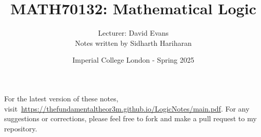 \documentclass[a4paper, 12pt, openany, oneside]{book}
\title{\vspace{-2em}MATH70132: Mathematical Logic}
\author{Lecturer: David Evans \\ Notes written by Sidharth Hariharan}
\date{Imperial College London - Spring 2025}
\begin{document}
\setlength{\abovedisplayskip}{7.5pt}  %
\setlength{\belowdisplayskip}{7.5pt}  %
\setlength{\abovedisplayshortskip}{2pt}
\setlength{\belowdisplayshortskip}{2pt}

\maketitle
\thispagestyle{empty}

\tableofcontents
\thispagestyle{empty}

\newpage




% 
% 

% 



\newpage

\thispagestyle{empty}

\printbibliography[title={References}, prenote=mybibnote]

For the latest version of these notes, visit~\url{https://thefundamentaltheor3m.github.io/LogicNotes/main.pdf}. For any suggestions or corrections, please feel free to fork and make a pull request to my repository.
\end{document}
